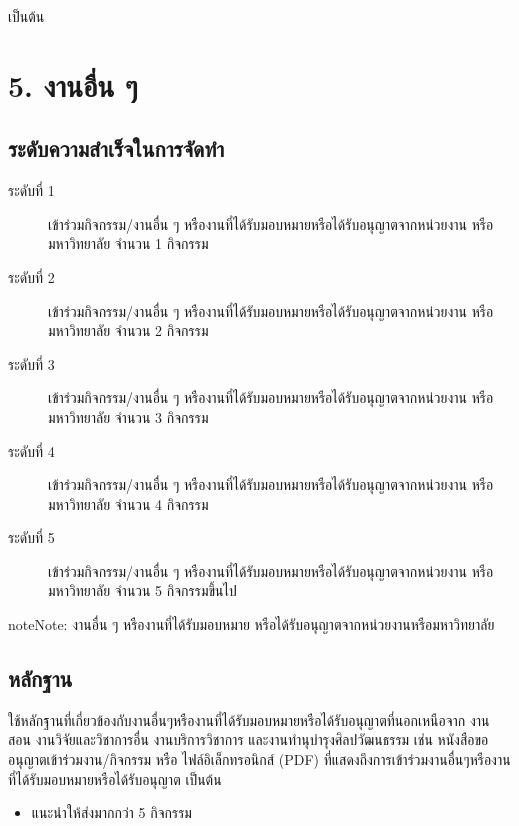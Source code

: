 \documentclass[a4paper,12pt,english]{sphinxmanual}
\begin{document}
เป็นต้น


\section{5. งานอื่น ๆ}
\label{\detokenize{submission_part1:id17}}

\subsection{ระดับความสำเร็จในการจัดทำ}
\label{\detokenize{submission_part1:id18}}\begin{description}
\item[{ระดับที่ 1}] \leavevmode
เข้าร่วมกิจกรรม/งานอื่น ๆ หรืองานที่ได้รับมอบหมายหรือได้รับอนุญาตจากหน่วยงาน หรือมหาวิทยาลัย จำนวน 1 กิจกรรม

\item[{ระดับที่ 2}] \leavevmode
เข้าร่วมกิจกรรม/งานอื่น ๆ หรืองานที่ได้รับมอบหมายหรือได้รับอนุญาตจากหน่วยงาน หรือมหาวิทยาลัย จำนวน 2 กิจกรรม

\item[{ระดับที่ 3}] \leavevmode
เข้าร่วมกิจกรรม/งานอื่น ๆ หรืองานที่ได้รับมอบหมายหรือได้รับอนุญาตจากหน่วยงาน หรือมหาวิทยาลัย จำนวน 3 กิจกรรม

\item[{ระดับที่ 4}] \leavevmode
เข้าร่วมกิจกรรม/งานอื่น ๆ หรืองานที่ได้รับมอบหมายหรือได้รับอนุญาตจากหน่วยงาน หรือมหาวิทยาลัย จำนวน 4 กิจกรรม

\item[{ระดับที่ 5}] \leavevmode
เข้าร่วมกิจกรรม/งานอื่น ๆ หรืองานที่ได้รับมอบหมายหรือได้รับอนุญาตจากหน่วยงาน หรือมหาวิทยาลัย จำนวน 5 กิจกรรมขึ้นไป

\end{description}

\begin{sphinxadmonition}{note}{Note:}
งานอื่น ๆ หรืองานที่ได้รับมอบหมาย หรือได้รับอนุญาตจากหน่วยงานหรือมหาวิทยาลัย
\end{sphinxadmonition}


\subsection{หลักฐาน}
\label{\detokenize{submission_part1:id19}}
ใช้หลักฐานที่เกี่ยวข้องกับงานอื่นๆหรืองานที่ได้รับมอบหมายหรือได้รับอนุญาตที่นอกเหนือจาก งานสอน งานวิจัยและวิชาการอื่น งานบริการวิชาการ และงานทำนุบำรุงศิลปวัฒนธรรม เช่น หนังสือขออนุญาตเข้าร่วมงาน/กิจกรรม หรือ ไฟล์อิเล็กทรอนิกส์ (PDF) ที่แสดงถึงการเข้าร่วมงานอื่นๆหรืองานที่ได้รับมอบหมายหรือได้รับอนุญาต เป็นต้น
\begin{itemize}
\item {} 
แนะนำให้ส่งมากกว่า 5 กิจกรรม

\end{itemize}
\end{document}
